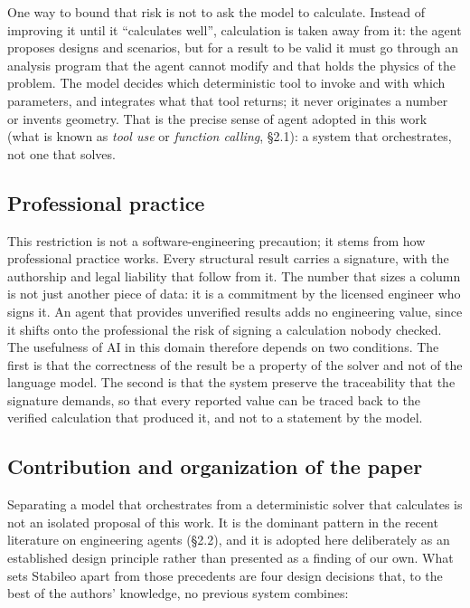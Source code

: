 \documentclass[11pt,a4paper]{article}
\begin{document}
One way to bound that risk is not to ask the model to calculate. Instead of improving it until it ``calculates well'', calculation is taken away from it: the agent proposes designs and scenarios, but for a result to be valid it must go through an analysis program that the agent cannot modify and that holds the physics of the problem. The model decides which deterministic tool to invoke and with which parameters, and integrates what that tool returns; it never originates a number or invents geometry. That is the precise sense of agent adopted in this work (what is known as \emph{tool use} or \emph{function calling}, §2.1): a system that orchestrates, not one that solves.

\subsection{Professional practice}\label{sec:1.3}

This restriction is not a software-engineering precaution; it stems from how professional practice works. Every structural result carries a signature, with the authorship and legal liability that follow from it. The number that sizes a column is not just another piece of data: it is a commitment by the licensed engineer who signs it. An agent that provides unverified results adds no engineering value, since it shifts onto the professional the risk of signing a calculation nobody checked. The usefulness of AI in this domain therefore depends on two conditions. The first is that the correctness of the result be a property of the solver and not of the language model. The second is that the system preserve the traceability that the signature demands, so that every reported value can be traced back to the verified calculation that produced it, and not to a statement by the model.

\subsection{Contribution and organization of the paper}\label{sec:1.4}

Separating a model that orchestrates from a deterministic solver that calculates is not an isolated proposal of this work. It is the dominant pattern in the recent literature on engineering agents (§2.2), and it is adopted here deliberately as an established design principle rather than presented as a finding of our own. What sets Stabileo apart from those precedents are four design decisions that, to the best of the authors' knowledge, no previous system combines:
\end{document}
